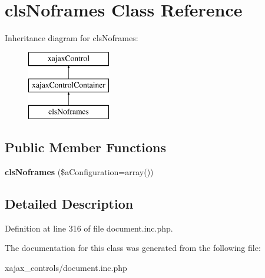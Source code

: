 \hypertarget{classclsNoframes}{
\section{clsNoframes Class Reference}
\label{classclsNoframes}
}
Inheritance diagram for clsNoframes:\begin{figure}[H]
\begin{center}
\leavevmode
\includegraphics[height=3.000000cm]{classclsNoframes}
\end{center}
\end{figure}
\subsection*{Public Member Functions}
\begin{DoxyCompactItemize}
\item 
\hypertarget{classclsNoframes_aeef91d8557446fbd56b0335ef2be15d1}{
{\bfseries clsNoframes} (\$aConfiguration=array())}
\label{classclsNoframes_aeef91d8557446fbd56b0335ef2be15d1}

\end{DoxyCompactItemize}


\subsection{Detailed Description}


Definition at line 316 of file document.inc.php.



The documentation for this class was generated from the following file:\begin{DoxyCompactItemize}
\item 
xajax\_\-controls/document.inc.php\end{DoxyCompactItemize}
